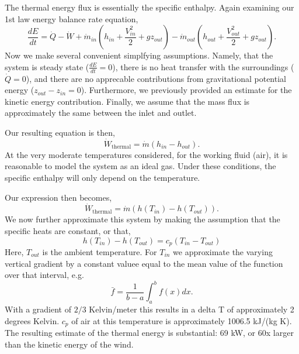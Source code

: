 \documentclass{article}
\begin{document}
The thermal energy flux is essentially the specific enthalpy. Again 
examining our 1st law energy balance rate equation, 
\begin{equation*}
\frac{dE}{dt} = \dot Q - \dot W + \dot m_{in}\left( h_{in} + \frac{V_{in}^2}{2} + gz_{out} \right)
- \dot m_{out}\left( h_{out} + \frac{V_{out}^2}{2} + gz_{out} \right).
\end{equation*}
Now we make several convenient simplfying assumptions. 
Namely, that the system is steady state ($\frac{dE}{dt} = 0$), 
there is no heat transfer with the surroundings ($\dot Q = 0$), 
and there are no apprecable contributions from gravitational 
potential energy ($z_{out}-z_{in} = 0$). Furthermore, we 
previously provided an estimate for the kinetic energy contribution. 
Finally, we assume that the mass flux is approximately the same 
between the inlet and outlet. 

Our resulting equation is then, 
\begin{equation*}
  \dot W_{\text{thermal}} = \dot m \left(h_{in}-h_{out}\right).
\end{equation*}
At the very moderate temperatures considered, 
for the working fluid (air), it is reasonable to model 
the system as an ideal gas. Under these conditions, 
the specific enthalpy will only depend on the temperature. 

Our expression then becomes, 
\begin{equation*}
  \dot W_{\text{thermal}} = \dot m \left(h(T_{in})-h(T_{out})\right).
\end{equation*}
We now further approximate this system by making the 
assumption that the specific heats are constant, or that, 
\begin{equation*}
  h(T_{in})-h(T_{out}) = c_p(T_{in}-T_{out})
\end{equation*}
Here, $T_{out}$ is the ambient temperature. For $T_{in}$ we 
approximate the varying vertical gradient by a constant valuee equal to the
mean value of the function over that interval, e.g.
\begin{equation*}
\bar f = \frac{1}{b-a} \int^b_a f(x) dx. 
\end{equation*}
With a gradient of $2/3$ Kelvin/meter this results in a delta T of approximately 2 degrees Kelvin. 
$c_p$ of air at this temperature is approximately 1006.5 kJ/(kg K). 
The resulting estimate of the thermal energy is substantial: 69 kW, or 60x larger than 
the kinetic energy of the wind.
\end{document}

